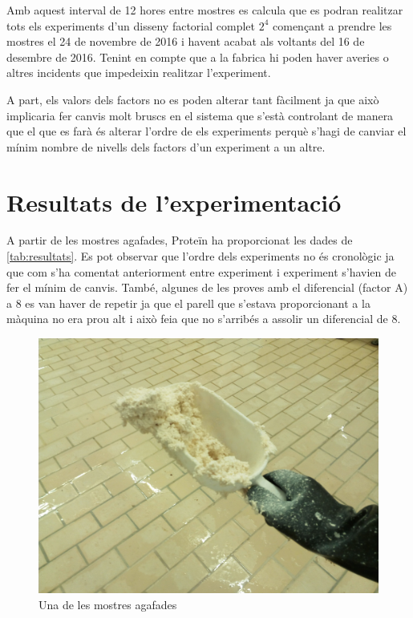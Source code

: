 \documentclass[a4paper]{article}
\begin{document}
Amb aquest interval de 12 hores entre mostres es calcula que es podran realitzar tots els experiments d'un disseny factorial complet $2^4$ començant a prendre les mostres el 24 de novembre de 2016 i havent acabat als voltants del 16 de desembre de 2016. Tenint en compte que a la fabrica hi poden haver averies o altres incidents que impedeixin realitzar l'experiment.

A part, els valors dels factors no es poden alterar tant fàcilment ja que això implicaria fer canvis molt bruscs en el sistema que s'està controlant de manera que el que es farà és alterar l'ordre de els experiments perquè s'hagi de canviar el mínim nombre de nivells dels factors d'un experiment a un altre.

\section{Resultats de l'experimentació}
A partir de les mostres agafades, Proteïn ha proporcionat les dades de \autoref{tab:resultats}. Es pot observar que l'ordre dels experiments no és cronològic ja que com s'ha comentat anteriorment entre experiment i experiment s'havien de fer el mínim de canvis. També, algunes de les proves amb el diferencial (factor A) a 8 es van haver de repetir ja que el parell que s'estava proporcionant a la màquina no era prou alt i això feia que no s'arribés a assolir un diferencial de 8.

\begin{figure}[H]
	\centering
	\includegraphics[width=.5\textwidth]{images/protein/mostra}
	\caption{Una de les mostres agafades}
	\label{fig:Mostra}
\end{figure} 	
\end{document}
